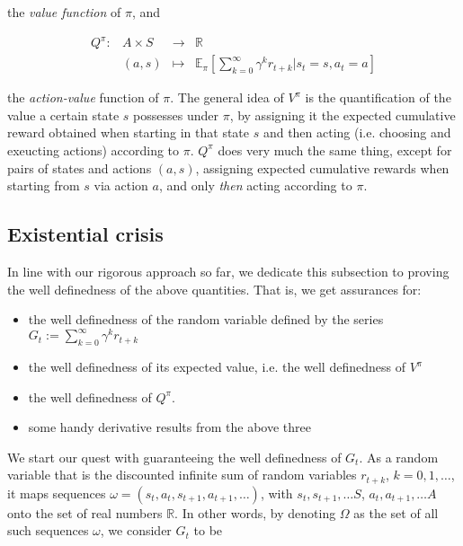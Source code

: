 \documentclass[11pt]{article} %
\begin{document}
the \textit{value function} of $\pi$, and 

\begin{equation}\label{ar_actValFunc}
	\begin{array}{llll}
		Q^{\pi} : 	& A \times S 	& \to 	& \mathbb{R} \\
				& (a,s)		& \mapsto	& \mathbb{E}_{\pi}[\sum_{k=0}^{\infty} \gamma^k r_{t+k} | s_t = s, a_t = a]
	\end{array}
\end{equation}

the \textit{action-value} function of $\pi$. The general idea of $V^{\pi}$ is the quantification of the value a certain state $s$ possesses under $\pi$, by assigning it the expected cumulative reward obtained when starting in that state $s$ and then acting (i.e. choosing and exeucting actions) according to $\pi$. $Q^{\pi}$ does very much the same thing, except for pairs of states and actions $(a,s)$, assigning expected cumulative rewards when starting from $s$ via action $a$, and only \textit{then} acting according to $\pi$.

\subsection{Existential crisis}

In line with our rigorous approach so far, we dedicate this subsection to proving the well definedness of the above quantities. That is, we get assurances for:

\begin{itemize}
	\item the well definedness of the random variable defined by the series $G_t := \sum_{k=0}^{\infty}\gamma^k r_{t+k}$
	\item the well definedness of its expected value, i.e. the well definedness of $V^{\pi}$
	\item the well definedness of $Q^{\pi}$.
	\item some handy derivative results from the above three 
\end{itemize}

We start our quest with guaranteeing the well definedness of $G_t$. As a random variable that is the discounted infinite sum of random variables $r_{t+k}$, $k=0,1,\dots$, it maps sequences $\omega = (s_t, a_t, s_{t+1}, a_{t+1}, \dots ) $, with $s_t,s_{t+1},\dots S$, $a_t, a_{t+1},\dots A$ onto the set of real numbers $\mathbb{R}$. In other words, by denoting $\Omega$ as the set of all such sequences $\omega$, we consider $G_t$ to be
\end{document}
